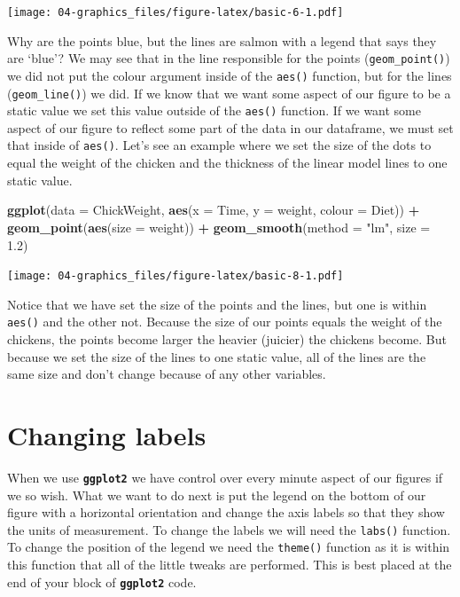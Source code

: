 \documentclass[]{book}
\newenvironment{Shaded}{\begin{snugshade}}{\end{snugshade}}
\newcommand{\KeywordTok}[1]{\textcolor[rgb]{0.13,0.29,0.53}{\textbf{#1}}}
\newcommand{\DataTypeTok}[1]{\textcolor[rgb]{0.13,0.29,0.53}{#1}}
\newcommand{\FloatTok}[1]{\textcolor[rgb]{0.00,0.00,0.81}{#1}}
\newcommand{\StringTok}[1]{\textcolor[rgb]{0.31,0.60,0.02}{#1}}
\newcommand{\OperatorTok}[1]{\textcolor[rgb]{0.81,0.36,0.00}{\textbf{#1}}}
\newcommand{\NormalTok}[1]{#1}
\theoremstyle{definition}
\theoremstyle{definition}
\theoremstyle{definition}
\theoremstyle{remark}
\begin{document}
\texttt{[image: 04-graphics\_files/figure-latex/basic-6-1.pdf]}

Why are the points blue, but the lines are salmon with a legend that
says they are `blue'? We may see that in the line responsible for the
points (\texttt{geom\_point()}) we did not put the colour argument
inside of the \texttt{aes()} function, but for the lines
(\texttt{geom\_line()}) we did. If we know that we want some aspect of
our figure to be a static value we set this value outside of the
\texttt{aes()} function. If we want some aspect of our figure to reflect
some part of the data in our dataframe, we must set that inside of
\texttt{aes()}. Let's see an example where we set the size of the dots
to equal the weight of the chicken and the thickness of the linear model
lines to one static value.

\begin{Shaded}
\begin{Highlighting}[]
\KeywordTok{ggplot}\NormalTok{(}\DataTypeTok{data =}\NormalTok{ ChickWeight, }\KeywordTok{aes}\NormalTok{(}\DataTypeTok{x =}\NormalTok{ Time, }\DataTypeTok{y =}\NormalTok{ weight, }\DataTypeTok{colour =}\NormalTok{ Diet)) }\OperatorTok{+}
\StringTok{  }\KeywordTok{geom_point}\NormalTok{(}\KeywordTok{aes}\NormalTok{(}\DataTypeTok{size =}\NormalTok{ weight)) }\OperatorTok{+}
\StringTok{  }\KeywordTok{geom_smooth}\NormalTok{(}\DataTypeTok{method =} \StringTok{"lm"}\NormalTok{, }\DataTypeTok{size =} \FloatTok{1.2}\NormalTok{)}
\end{Highlighting}
\end{Shaded}

\texttt{[image: 04-graphics\_files/figure-latex/basic-8-1.pdf]}

Notice that we have set the size of the points and the lines, but one is
within \texttt{aes()} and the other not. Because the size of our points
equals the weight of the chickens, the points become larger the heavier
(juicier) the chickens become. But because we set the size of the lines
to one static value, all of the lines are the same size and don't change
because of any other variables.

\section{Changing labels}\label{changing-labels}

When we use \textbf{\texttt{ggplot2}} we have control over every minute
aspect of our figures if we so wish. What we want to do next is put the
legend on the bottom of our figure with a horizontal orientation and
change the axis labels so that they show the units of measurement. To
change the labels we will need the \texttt{labs()} function. To change
the position of the legend we need the \texttt{theme()} function as it
is within this function that all of the little tweaks are performed.
This is best placed at the end of your block of
\textbf{\texttt{ggplot2}} code.
\end{document}
